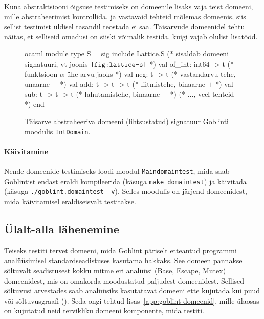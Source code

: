 \documentclass[../thesis.tex]{subfiles}
\begin{document}
Kuna abstraktsiooni õigsuse testimiseks on domeenile lisaks vaja teist domeeni, mille abstraheerimist kontrollida, ja vastavaid tehteid mõlemas domeenis, siis sellist testimist üldisel tasandil teostada ei saa. Täisarvude domeenidel tehtu näitas, et selliseid omadusi on siiski võimalik testida, kuigi vajab olulist lisatööd.

\begin{figure}
	\centering
	\begin{bminted}[mathescape]{ocaml}
		module type S =
		sig
		  include Lattice.S (* sisaldab domeeni signatuuri, vt joonis $\texttt{\ref{fig:lattice-s}}$ *)
		  val of_int: int64 -> t (* funktsioon $\alpha$ ühe arvu jaoks *)
		  val neg: t -> t (* vastandarvu tehe, unaarne $-$ *)
		  val add: t -> t -> t (* liitmistehe, binaarne $+$ *)
		  val sub: t -> t -> t (* lahutamistehe, binaarne $-$ *)
		  (* ..., veel tehteid *)
		end
	\end{bminted}
	\caption{Täisarve abstraheeriva domeeni (lihtsustatud) signatuur Goblinti moodulis \texttt{IntDomain}.}
	\label{fig:intdomain-s}
\end{figure}

\paragraph{Käivitamine}
Nende domeenide testimiseks loodi moodul \texttt{Maindomaintest}, mida saab Goblintist endast eraldi kompileerida (käsuga \texttt{make domaintest}) ja käivitada (käsuga \texttt{./goblint.domaintest -v}). Selles moodulis on järjend domeenidest, mida käivitamisel eraldiseisvalt testitakse.

\subsection{Ülalt-alla lähenemine}
Teiseks testiti tervet domeeni, mida Goblint päriselt etteantud programmi analüüsimisel standardseadistuses kasutama hakkaks. See domeen pannakse sõltuvalt seadistusest kokku mitme eri analüüsi (Base, Escape, Mutex) domeenidest, mis on omakorda moodustatud paljudest domeenidest. Sellised sõltuvusi arvestades saab analüüsiks kasutatavat domeeni ette kujutada kui puud või sõltuvusgraafi (). Seda ongi tehtud lisas~\ref{app:goblint-domeenid}, mille ülaosas on kujutatud neid tervikliku domeeni komponente, mida testiti.
\end{document}
